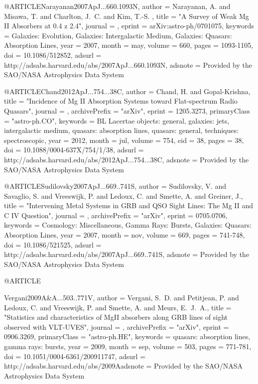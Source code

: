\documentclass[twocolumn]{aastex62}
\begin{document}
{{{{{{{{{{@ARTICLE{Narayanan2007ApJ...660.1093N,
   author = {{Narayanan}, A. and {Misawa}, T. and {Charlton}, J.~C. and {Kim}, T.-S.
	},
    title = "{A Survey of Weak Mg II Absorbers at 0.4 {\lt} z {\lt} 2.4}",
  journal = {\apj},
   eprint = {arXiv:astro-ph/0701075},
 keywords = {Galaxies: Evolution, Galaxies: Intergalactic Medium, Galaxies: Quasars: Absorption Lines},
     year = 2007,
    month = may,
   volume = 660,
    pages = {1093-1105},
      doi = {10.1086/512852},
   adsurl = {http://adsabs.harvard.edu/abs/2007ApJ...660.1093N},
  adsnote = {Provided by the SAO/NASA Astrophysics Data System}
}

@ARTICLE{Chand2012ApJ...754...38C,
   author = {{Chand}, H. and {Gopal-Krishna}},
    title = "{Incidence of Mg II Absorption Systems toward Flat-spectrum Radio Quasars}",
  journal = {\apj},
archivePrefix = "arXiv",
   eprint = {1205.3273},
 primaryClass = "astro-ph.CO",
 keywords = {BL Lacertae objects: general, galaxies: jets, intergalactic medium, quasars: absorption lines, quasars: general, techniques: spectroscopic},
     year = 2012,
    month = jul,
   volume = 754,
      eid = {38},
    pages = {38},
      doi = {10.1088/0004-637X/754/1/38},
   adsurl = {http://adsabs.harvard.edu/abs/2012ApJ...754...38C},
  adsnote = {Provided by the SAO/NASA Astrophysics Data System}
}




@ARTICLE{Sudilovsky2007ApJ...669..741S,
   author = {{Sudilovsky}, V. and {Savaglio}, S. and {Vreeswijk}, P. and 
	{Ledoux}, C. and {Smette}, A. and {Greiner}, J.},
    title = "{Intervening Metal Systems in GRB and QSO Sight Lines: The Mg II and C IV Question}",
  journal = {\apj},
archivePrefix = "arXiv",
   eprint = {0705.0706},
 keywords = {Cosmology: Miscellaneous, Gamma Rays: Bursts, Galaxies: Quasars: Absorption Lines},
     year = 2007,
    month = nov,
   volume = 669,
    pages = {741-748},
      doi = {10.1086/521525},
   adsurl = {http://adsabs.harvard.edu/abs/2007ApJ...669..741S},
  adsnote = {Provided by the SAO/NASA Astrophysics Data System}
}

@ARTICLE{Vergani2009A&A...503..771V,
   author = {{Vergani}, S.~D. and {Petitjean}, P. and {Ledoux}, C. and {Vreeswijk}, P. and 
	{Smette}, A. and {Meurs}, E.~J.~A.},
    title = "{Statistics and characteristics of MgII absorbers along GRB lines of sight observed with VLT-UVES}",
  journal = {\aap},
archivePrefix = "arXiv",
   eprint = {0906.3269},
 primaryClass = "astro-ph.HE",
 keywords = {quasars: absorption lines, gamma rays: bursts},
     year = 2009,
    month = sep,
   volume = 503,
    pages = {771-781},
      doi = {10.1051/0004-6361/200911747},
   adsurl = {http://adsabs.harvard.edu/abs/2009Aadsnote = {Provided by the SAO/NASA Astrophysics Data System}
}



}}}}}}}}}}}
\end{document}
